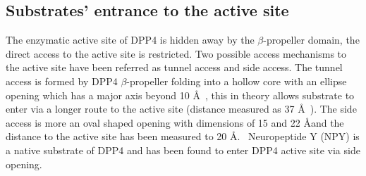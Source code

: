 \subsection{Substrates' entrance to the active site}

The enzymatic active site of DPP4 is hidden away by the $\beta$-propeller domain, the direct access to the active site is restricted. Two possible access mechanisms to the active site have been referred as tunnel access and side access. The tunnel access is formed by DPP4 $\beta$-propeller  folding into a hollow core with an ellipse opening which has a major axis beyond 10 \AA~\cite{Hiramatsu2003}, this in theory allows substrate to enter via a longer route to the active site (distance measured as 37 \AA~\cite{Engel_2003}). The side access is more an oval shaped opening with dimensions of 15 and 22 \AA and the distance to the active site has been measured to 20 \AA.~\cite{Engel_2003, Rasmussen_2002,Weihofen_2004} Neuropeptide Y (NPY) is a native substrate of DPP4 and has been found to enter DPP4 active site via side opening. ~\cite{Aertgeerts_2004}